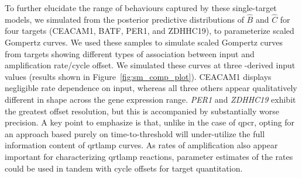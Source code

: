 \documentclass[../thesis.tex]{subfiles}
\begin{document}

To further elucidate the range of behaviours captured by these single-target models, we simulated from the posterior predictive distributions of $\hat{B}$ and $\hat{C}$ for four targets ({CEACAM1}, {BATF}, {PER1}, and {ZDHHC19}), to parameterize scaled Gompertz curves. We used these samples to simulate scaled Gompertz curves from targets showing different types of association between  input and amplification rate/cycle offset. We simulated these curves at three -derived  input values (results shown in Figure~\ref{fig:sm_comp_plot}). CEACAM1 displays negligible rate dependence on  input, whereas all three others appear qualitatively different in shape across the gene expression range. \emph{PER1} and \emph{ZDHHC19} exhibit the greatest offset resolution, but this is accompanied by substantially worse precision. A key point to emphasize is that, unlike in the case of \gls{qpcr}, opting for an approach based purely on time-to-threshold will under-utilize the full information content of \gls{qrtlamp} curves. As rates of amplification also appear important for characterizing \gls{qrtlamp} reactions, parameter estimates of the rates could be used in tandem with cycle offsets for target quantitation.
\end{document}
